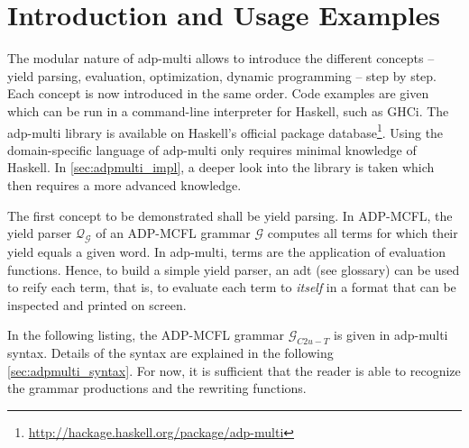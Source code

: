 \documentclass[
    a4paper,
    12pt,
    twoside,
    BCOR=12mm,
    parskip=half,
    chapterprefix,
    numbers=noenddot,
    bibliography=totoc
]{scrbook}
\begin{document}
\section{Introduction and Usage Examples}
\label{sec:intro_adpmulti}

The modular nature of adp-multi allows to introduce the different concepts -- yield parsing, evaluation, optimization, dynamic programming -- step by step. Each concept is now introduced in the same order. Code examples are given which can be run in a command-line interpreter for Haskell, such as GHCi. The adp-multi library is available on Haskell's official package database\footnote{\url{http://hackage.haskell.org/package/adp-multi}}. Using the domain-specific language of adp-multi only requires minimal knowledge of Haskell. In \cref{sec:adpmulti_impl}, a deeper look into the library is taken which then requires a more advanced knowledge.

The first concept to be demonstrated shall be yield parsing. In ADP-MCFL, the yield parser $\mathcal{Q}_\mathcal{G}$ of an ADP-MCFL grammar $\mathcal{G}$ computes all terms for which their yield equals a given word. In adp-multi, terms are the application of evaluation functions. Hence, to build a simple yield parser, an \gls{adt} (see glossary) can be used to reify each term, that is, to evaluate each term to \emph{itself} in a format that can be inspected and printed on screen.

In the following listing, the ADP-MCFL grammar $\mathcal{G}_{C2u-T}$ is given in adp-multi syntax. Details of the syntax are explained in the following \cref{sec:adpmulti_syntax}. For now, it is sufficient that the reader is able to recognize the grammar productions and the rewriting functions.
\end{document}
